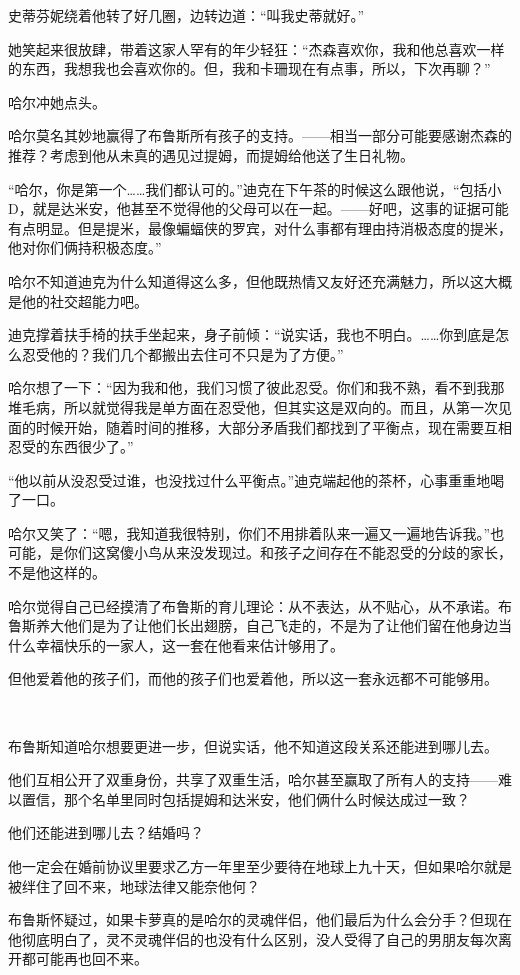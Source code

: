 \documentclass[../main.tex]{subfiles}
\begin{document}
史蒂芬妮绕着他转了好几圈，边转边道：“叫我史蒂就好。”

她笑起来很放肆，带着这家人罕有的年少轻狂：“杰森喜欢你，我和他总喜欢一样的东西，我想我也会喜欢你的。但，我和卡珊现在有点事，所以，下次再聊？”

哈尔冲她点头。

哈尔莫名其妙地赢得了布鲁斯所有孩子的支持。——相当一部分可能要感谢杰森的推荐？考虑到他从未真的遇见过提姆，而提姆给他送了生日礼物。

“哈尔，你是第一个……我们都认可的。”迪克在下午茶的时候这么跟他说，“包括小D，就是达米安，他甚至不觉得他的父母可以在一起。——好吧，这事的证据可能有点明显。但是提米，最像蝙蝠侠的罗宾，对什么事都有理由持消极态度的提米，他对你们俩持积极态度。”

哈尔不知道迪克为什么知道得这么多，但他既热情又友好还充满魅力，所以这大概是他的社交超能力吧。

迪克撑着扶手椅的扶手坐起来，身子前倾：“说实话，我也不明白。……你到底是怎么忍受他的？我们几个都搬出去住可不只是为了方便。”

哈尔想了一下：“因为我和他，我们习惯了彼此忍受。你们和我不熟，看不到我那堆毛病，所以就觉得我是单方面在忍受他，但其实这是双向的。而且，从第一次见面的时候开始，随着时间的推移，大部分矛盾我们都找到了平衡点，现在需要互相忍受的东西很少了。”

“他以前从没忍受过谁，也没找过什么平衡点。”迪克端起他的茶杯，心事重重地喝了一口。

哈尔又笑了：“嗯，我知道我很特别，你们不用排着队来一遍又一遍地告诉我。”也可能，是你们这窝傻小鸟从来没发现过。和孩子之间存在不能忍受的分歧的家长，不是他这样的。

哈尔觉得自己已经摸清了布鲁斯的育儿理论：从不表达，从不贴心，从不承诺。布鲁斯养大他们是为了让他们长出翅膀，自己飞走的，不是为了让他们留在他身边当什么幸福快乐的一家人，这一套在他看来估计够用了。

但他爱着他的孩子们，而他的孩子们也爱着他，所以这一套永远都不可能够用。

~\

布鲁斯知道哈尔想要更进一步，但说实话，他不知道这段关系还能进到哪儿去。

他们互相公开了双重身份，共享了双重生活，哈尔甚至赢取了所有人的支持——难以置信，那个名单里同时包括提姆和达米安，他们俩什么时候达成过一致？

他们还能进到哪儿去？结婚吗？

他一定会在婚前协议里要求乙方一年里至少要待在地球上九十天，但如果哈尔就是被绊住了回不来，地球法律又能奈他何？

布鲁斯怀疑过，如果卡萝真的是哈尔的灵魂伴侣，他们最后为什么会分手？但现在他彻底明白了，灵不灵魂伴侣的也没有什么区别，没人受得了自己的男朋友每次离开都可能再也回不来。
\end{document}
